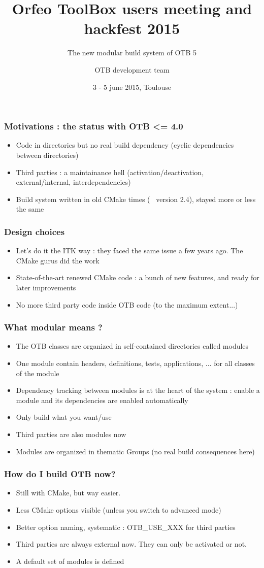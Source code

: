 \documentclass[8pt]{beamer}
\title{Orfeo ToolBox users meeting and hackfest 2015}
\subtitle{The new modular build system of OTB 5}
\author{OTB development team}%
\date{3 - 5 june 2015, Toulouse}
\begin{document}
\begin{frame}
\titlepage
\end{frame}

\begin{frame}
\frametitle{Motivations : the status with OTB <= 4.0}
\begin{itemize}
\item Code in directories but no real build dependency (cyclic dependencies between directories)
\item Third parties : a maintainance hell (activation/deactivation, external/internal, interdependencies)
\item Build system written in old CMake times (~ version 2.4), stayed more or less the same
\end{itemize}
\end{frame}

\begin{frame}
\frametitle{Design choices}
\begin{itemize}
\item Let's do it the ITK way : they faced the same issue a few years ago. The CMake gurus did the work
\item State-of-the-art renewed CMake code : a bunch of new features, and ready for later improvements
\item No more third party code inside OTB code (to the maximum extent...)
\end{itemize}
\end{frame}


\begin{frame}
\frametitle{What modular means ?}
\begin{itemize}
\item The OTB classes are organized in self-contained directories called modules
\item One module contain headers, definitions, tests, applications, ... for all classes of the module
\item Dependency tracking between modules is at the heart of the system : enable a module and its dependencies are enabled automatically
\item Only build what you want/use
\item Third parties are also modules now
\item Modules are organized in thematic Groups (no real build consequences here)
\end{itemize}
\end{frame}

\begin{frame}
\frametitle{How do I build OTB now?}
\begin{itemize}
\item Still with CMake, but way easier.
\item Less CMake options visible (unless you switch to advanced mode)
\item Better option naming, systematic : OTB\_USE\_XXX for third parties
\item Third parties are always external now. They can only be activated or not.
\item A default set of modules is defined
\end{itemize}
\end{frame}
\end{document}
